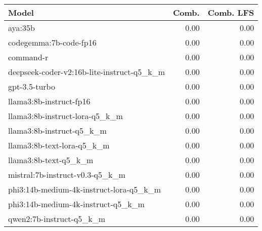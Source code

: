 \begin{tabular}{lrr}
\toprule
Model & Comb. & Comb. LFS \\
\midrule
aya:35b & 0.00 & 0.00 \\
codegemma:7b-code-fp16 & 0.00 & 0.00 \\
command-r & 0.00 & 0.00 \\
deepseek-coder-v2:16b-lite-instruct-q5\_k\_m & 0.00 & 0.00 \\
gpt-3.5-turbo & 0.00 & 0.00 \\
llama3:8b-instruct-fp16 & 0.00 & 0.00 \\
llama3:8b-instruct-lora-q5\_k\_m & 0.00 & 0.00 \\
llama3:8b-instruct-q5\_k\_m & 0.00 & 0.00 \\
llama3:8b-text-lora-q5\_k\_m & 0.00 & 0.00 \\
llama3:8b-text-q5\_k\_m & 0.00 & 0.00 \\
mistral:7b-instruct-v0.3-q5\_k\_m & 0.00 & 0.00 \\
phi3:14b-medium-4k-instruct-lora-q5\_k\_m & 0.00 & 0.00 \\
phi3:14b-medium-4k-instruct-q5\_k\_m & 0.00 & 0.00 \\
qwen2:7b-instruct-q5\_k\_m & 0.00 & 0.00 \\
\bottomrule
\end{tabular}
